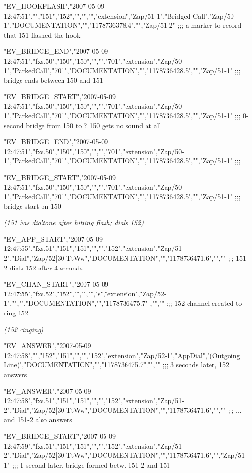 \begin{astlisting}
"EV\_HOOKFLASH","2007-05-09 12:47:51","","151","152","","","","extension","Zap/51-1","Bridged Call","Zap/50-1","DOCUMENTATION","","1178736378.4","","Zap/51-2"            ;;; a marker to record that 151 flashed the hook

"EV\_BRIDGE\_END","2007-05-09 12:47:51","fxs.50","150","150","","","701","extension","Zap/50-1","ParkedCall","701","DOCUMENTATION","","1178736428.5","","Zap/51-1"         ;;; bridge ends between 150 and 151

"EV\_BRIDGE\_START","2007-05-09 12:47:51","fxs.50","150","150","","","701","extension","Zap/50-1","ParkedCall","701","DOCUMENTATION","","1178736428.5","","Zap/51-1"       ;;; 0-second bridge from 150 to ?  150 gets no sound at all

"EV\_BRIDGE\_END","2007-05-09 12:47:51","fxs.50","150","150","","","701","extension","Zap/50-1","ParkedCall","701","DOCUMENTATION","","1178736428.5","","Zap/51-1"         ;;;

"EV\_BRIDGE\_START","2007-05-09 12:47:51","fxs.50","150","150","","","701","extension","Zap/50-1","ParkedCall","701","DOCUMENTATION","","1178736428.5","","Zap/51-1"       ;;; bridge start on 150

{\it (151 has dialtone after hitting flash; dials 152)}

"EV\_APP\_START","2007-05-09 12:47:55","fxs.51","151","151","","","152","extension","Zap/51-2","Dial","Zap/52|30|TtWw","DOCUMENTATION","","1178736471.6","",""             ;;; 151-2 dials 152 after 4 seconds

"EV\_CHAN\_START","2007-05-09 12:47:55","fxs.52","152","","","","s","extension","Zap/52-1","","","DOCUMENTATION","","1178736475.7" ,"",""                                  ;;; 152 channel created to ring 152.

{\it (152 ringing)}

"EV\_ANSWER","2007-05-09 12:47:58","","152","151","","","152","extension","Zap/52-1","AppDial","(Outgoing Line)","DOCUMENTATION","","1178736475.7","",""                  ;;; 3 seconds later, 152 answers

"EV\_ANSWER","2007-05-09 12:47:58","fxs.51","151","151","","","152","extension","Zap/51-2","Dial","Zap/52|30|TtWw","DOCUMENTATION","","1178736471.6","",""                ;;;   ... and 151-2 also answers

"EV\_BRIDGE\_START","2007-05-09 12:47:59","fxs.51","151","151","","","152","extension","Zap/51-2","Dial","Zap/52|30|TtWw","DOCUMENTATION","","1178736471.6","","Zap/51-1"  ;;; 1 second later, bridge formed betw. 151-2 and 151


\end{astlisting}
